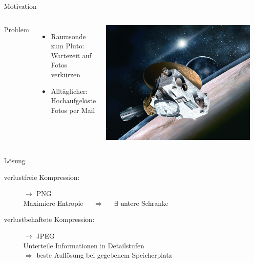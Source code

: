 {
\begin{frame}{Motivation}
	\begin{columns}[c,onlytextwidth]
		\alert{Problem}
		\begin{itemize}
			\item Raumsonde zum Pluto:\\
			Wartezeit auf Fotos verkürzen\pause
			\item Alltäglicher:\\
			Hochaufgelöste Fotos per Mail
		\end{itemize}\pause[1]
		
		\includegraphics[width=\textwidth]{newHorizons.jpg}
	\end{columns}\vspace{-1mm}\pause[3]
	\alert{Lösung}\vspace{-2mm}
	\begin{description}
		\item [verlustfreie Kompression:]  \hspace{48mm}$\rightarrow$ PNG\\
		\hspace{-14.4mm}Maximiere Entropie\ \ \ $\Rightarrow$\ \ \ $\exists$ untere Schranke\pause
		\item [verlustbehaftete Kompression:] \hspace{39mm}$\rightarrow$ JPEG\\
		\hspace{-14.4mm}Unterteile Informationen in Detailstufen\\
		\hspace{-20.2mm}$\Rightarrow$\hspace{1.1mm} beste Auflösung bei gegebenem Speicherplatz
	\end{description}
\end{frame}}

